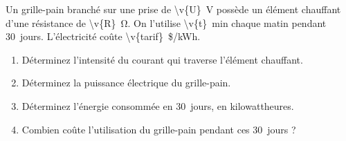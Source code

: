 Un grille-pain branché sur une prise de \qty{\v{U}}{V} possède un élément chauffant d'une résistance de \qty{\v{R}}{\ohm}. On l'utilise \qty{\v{t}}{min} chaque matin pendant \qty{30}{jours}. L'électricité coûte \qty[minimum-decimal-digits=2]{\v{tarif}}{\$/kWh}.

\begin{enumerate}[label=\alph*)]
    \item Déterminez l'intensité du courant qui traverse l'élément chauffant.
    \item Déterminez la puissance électrique du grille-pain.
    \item Déterminez l'énergie consommée en \qty{30}{jours}, en kilowattheures.
    \item Combien coûte l'utilisation du grille-pain pendant ces \qty{30}{jours} ?
\end{enumerate}
